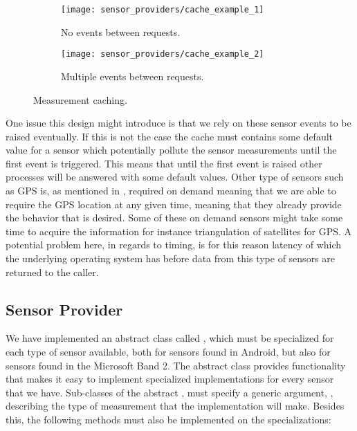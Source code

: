 \begin{figure}[!htbp]
\begin{subfigure}[!t]{.5\textwidth}
  \centering
  \texttt{[image: sensor\_providers/cache\_example\_1]}
  \caption{No events between requests.}
  \label{fig:cache_no_event_between}
\end{subfigure}
\begin{subfigure}[!t]{.5\textwidth}
  \centering
  \texttt{[image: sensor\_providers/cache\_example\_2]}
  \caption{Multiple events between requests.}
  \label{fig:cache_multiple_event_between}
\end{subfigure}
\caption{Measurement caching.}
\label{fig:cache_examples}
\end{figure}
\FloatBarrier

One issue this design might introduce is that we rely on these sensor events to be raised eventually. If this is not the case the cache must contains some default value for a sensor which potentially pollute the sensor measurements until the first event is triggered. This means that until the first event is raised other processes will be answered with some default values. Other type of sensors such as GPS is, as mentioned in , required on demand meaning that we are able to require the GPS location at any given time, meaning that they already provide the behavior that is desired. Some of these on demand sensors might take some time to acquire the information for instance triangulation of satellites for GPS. A potential problem here, in regards to timing, is for this reason latency of which the underlying operating system has before data from this type of sensors are returned to the caller.

\subsection{Sensor Provider}
\label{sub:providing_sensor_data_implementation}
We have implemented an abstract class called , which must be specialized for each type of sensor available, both for sensors found in Android, but also for sensors found in the Microsoft Band 2. The abstract class provides functionality that makes it easy to implement specialized implementations for every sensor that we have. Sub-classes of the abstract , must specify a generic argument, , describing the type of measurement that the implementation will make. Besides this, the following methods must also be implemented on the specializations:

